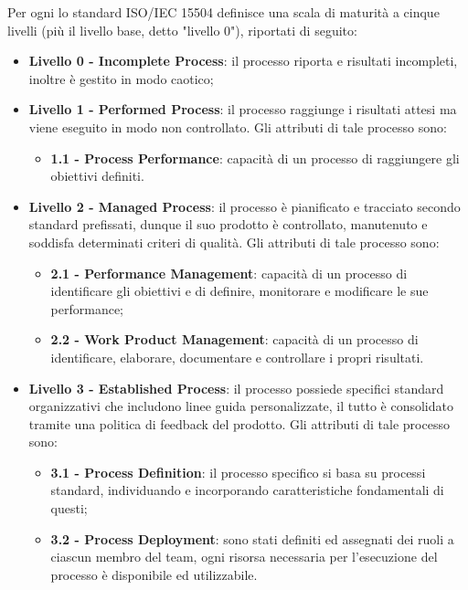 \appendix
{}
Per ogni  lo standard ISO/IEC 15504 definisce una scala di maturità a cinque livelli (più il livello base, detto "livello 0"), riportati di seguito:
\begin{itemize}
	\item \textbf {Livello 0 - Incomplete Process}: il processo riporta  e risultati incompleti, inoltre è gestito in modo caotico;
	\item \textbf {Livello 1 - Performed Process}:  il processo raggiunge i risultati attesi ma viene eseguito in modo non controllato. Gli attributi di tale processo sono:
	\begin{itemize}
		\item \textbf{1.1 - Process Performance}: capacità di un processo di raggiungere gli obiettivi definiti.
	\end{itemize}
	\item \textbf {Livello 2 - Managed Process}: il processo è pianificato e tracciato secondo standard prefissati, dunque il suo prodotto è controllato, manutenuto e soddisfa determinati criteri di qualità. Gli attributi di tale processo sono:
	\begin{itemize}
		\item \textbf{2.1 - Performance Management}: capacità di un processo di identificare gli obiettivi e di definire, monitorare e modificare le sue performance;
		\item \textbf{2.2 - Work Product Management}: capacità di un processo di identificare, elaborare, documentare e controllare i propri risultati.
	\end{itemize}
	\item \textbf {Livello 3 - Established Process}: il processo possiede specifici standard organizzativi che includono linee guida personalizzate, il tutto è consolidato tramite una politica di feedback del prodotto. Gli attributi di tale processo sono:
	\begin{itemize}
		\item \textbf{3.1 - Process Definition}: il processo specifico si basa su processi standard, individuando e incorporando caratteristiche fondamentali di questi;
		\item \textbf{3.2 - Process Deployment}: sono stati definiti ed assegnati dei ruoli a ciascun membro del team, ogni risorsa necessaria per l'esecuzione del processo è disponibile ed utilizzabile.

\end{itemize}
\end{itemize}
